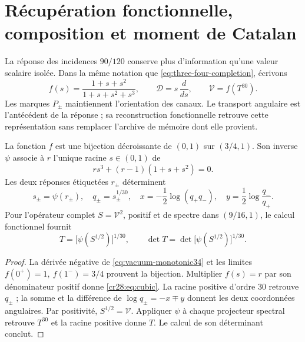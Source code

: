 \section{Récupération fonctionnelle, composition et moment de Catalan}
\label{cr28:sec:restitucion-constitutiva}

La réponse des incidences \(90/120\) conserve plus d'information qu'une valeur scalaire isolée. Dans la même notation que \eqref{eq:three-four-completion}, écrivons
\[
 f(s)=\frac{1+s+s^2}{1+s+s^2+s^3},\qquad
 \mathcal D=s\,\frac{d}{ds},\qquad
 \mathcal V=f(T^{30}).
\]
Les marques \(P_\pm\) maintiennent l'orientation des canaux. Le transport angulaire est l'antécédent de la réponse ; sa reconstruction fonctionnelle retrouve cette représentation sans remplacer l'archive de mémoire dont elle provient.

\begin{theorem}
\label{cr28:thm:inversion-constitutiva} La fonction \(f\) est une bijection décroissante de \((0,1)\) sur \((3/4,1)\). Son inverse \(\psi\) associe à \(r\) l'unique racine \(s\in(0,1)\) de
\begin{equation}
 r s^3+(r-1)(1+s+s^2)=0.
 \label{cr28:eq:cubic}
\end{equation}
Les deux réponses étiquetées \(r_\pm\) déterminent
\begin{equation}
 s_\pm=\psi(r_\pm),\quad q_\pm=s_\pm^{1/30},\quad
 x=-\frac12\log(q_+q_-),\quad
 y=\frac12\log\frac{q_-}{q_+}.
 \label{cr28:eq:angular-recovery}
\end{equation}
Pour l'opérateur complet \(S=\mathcal V^2\), positif et de spectre dans \((9/16,1)\), le calcul fonctionnel fournit
\begin{equation}
 T=\bigl[\psi(S^{1/2})\bigr]^{1/30},\qquad
 \det T=\det\bigl[\psi(S^{1/2})\bigr]^{1/30}.
 \label{cr28:eq:operator-recovery}
\end{equation}
\end{theorem}
\begin{proof}
La dérivée négative de \eqref{eq:vacuum-monotonic34} et les limites \(f(0^+)=1,\ f(1^-)=3/4\) prouvent la bijection. Multiplier \(f(s)=r\) par son dénominateur positif donne \eqref{cr28:eq:cubic}. La racine positive d'ordre \(30\) retrouve \(q_\pm\) ; la somme et la différence de \(\log q_\pm=-x\mp y\) donnent les deux coordonnées angulaires. Par positivité, \(S^{1/2}=\mathcal V\). Appliquer \(\psi\) à chaque projecteur spectral retrouve \(T^{30}\) et la racine positive donne \(T\). Le calcul de son déterminant conclut.
\end{proof}

